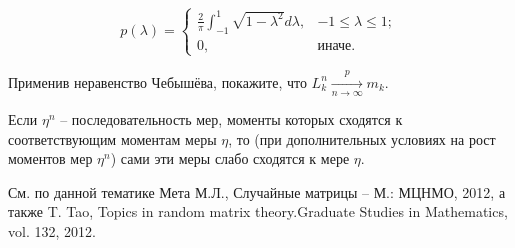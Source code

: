 \begin{problem}
\[p(\lambda )=\left\{\begin{array}{cc} {\frac{2}{\pi } \int _{-1}^{1}\sqrt{1-\lambda ^{2} } d\lambda , } & {-1\le \lambda \le 1;} \\ {0,} & {\text{иначе.}} \end{array}\right. \] 

\noindent Применив неравенство Чебышёва, покажите, что $L_{k}^{n} \mathop{\to }\limits_{n\to \infty }^{p} m_{k} .$


\end{problem}


\begin{remark}
Если $\eta ^{n} $ -- последовательность мер, моменты которых сходятся к соответствующим моментам меры $\eta $, то (при дополнительных условиях на рост моментов мер $\eta ^{n} $) сами эти меры слабо сходятся к мере $\eta $.

См. по данной тематике Мета М.Л., Случайные матрицы -- М.:  МЦНМО, 2012, а также T. Tao, Topics in random matrix theory.Graduate Studies in Mathematics, vol. 132, 2012. 
\end{remark}

